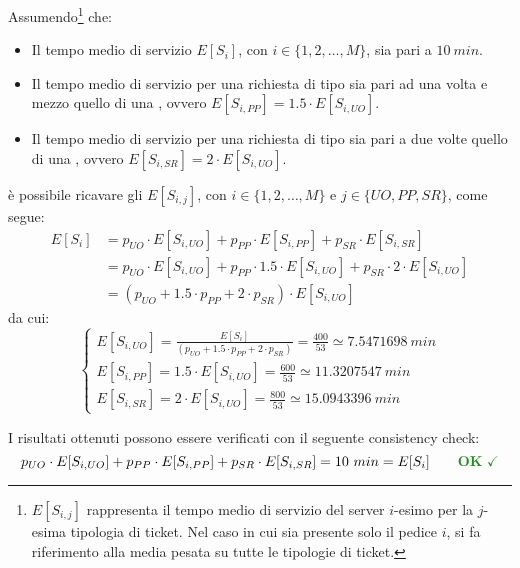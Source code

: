 \newpage
Assumendo\footnote{$E[S_{i,j}]$ rappresenta il tempo medio di servizio del server $i$-esimo per la $j$-esima tipologia di ticket. Nel caso in cui sia presente solo il pedice $i$, si fa riferimento alla media pesata su tutte le tipologie di ticket.} che:
\begin{itemize}
\item Il tempo medio di servizio $E[S_i]$, con $i \in \lbrace 1, 2, \dots, M \rbrace$, sia pari a $10\ min$.
\item Il tempo medio di servizio per una richiesta di tipo \pp{} sia pari ad una volta e mezzo quello di una \uo{}, ovvero $E[S_{i, PP}] = 1.5 \cdot E[S_{i, UO}]$.
\item Il tempo medio di servizio per una richiesta di tipo \sr{} sia pari a due volte quello di una \uo{}, ovvero $E[S_{i, SR}] = 2 \cdot E[S_{i, UO}]$.
\end{itemize}
è possibile ricavare gli $E[S_{i,j}]$, con $i \in \lbrace 1, 2, \dots, M \rbrace$ e $j \in \lbrace UO, PP, SR \rbrace$, come segue:
\begin{equation}
\begin{split}
E[S_i] &= p_{UO}\cdot E[S_{i,UO}] + p_{PP}\cdot E[S_{i,PP}] + p_{SR}\cdot E[S_{i,SR}] \\
&= p_{UO}\cdot E[S_{i,UO}] + p_{PP}\cdot 1.5\cdot E[S_{i,UO}] + p_{SR}\cdot 2\cdot E[S_{i,UO}] \\
&= (p_{UO} + 1.5\cdot p_{PP} + 2\cdot p_{SR}) \cdot E[S_{i,UO}]
\end{split}
\end{equation}
da cui:
\begin{equation}
\begin{cases}
E[S_{i,UO}] = \frac{E[S_i]}{(p_{UO} + 1.5\cdot p_{PP} + 2\cdot p_{SR})} = \frac{400}{53} \simeq 7.5471698\ min \\[1em]
E[S_{i,PP}] = 1.5\cdot E[S_{i,UO}] = \frac{600}{53} \simeq 11.3207547\ min \\[1em]
E[S_{i,SR}] = 2 \cdot E[S_{i,UO}] = \frac{800}{53} \simeq 15.0943396\ min
\end{cases}
\end{equation}

I risultati ottenuti possono essere verificati con il seguente consistency check:
\begin{equation}
p_{UO}\cdot E[S_{i,UO}] + p_{PP}\cdot E[S_{i,PP}] + p_{SR}\cdot E[S_{i,SR}] = 10\ min = E[S_i]\qquad \text{\color{forestgreen}\textbf{OK} \checkmark}
\end{equation}

